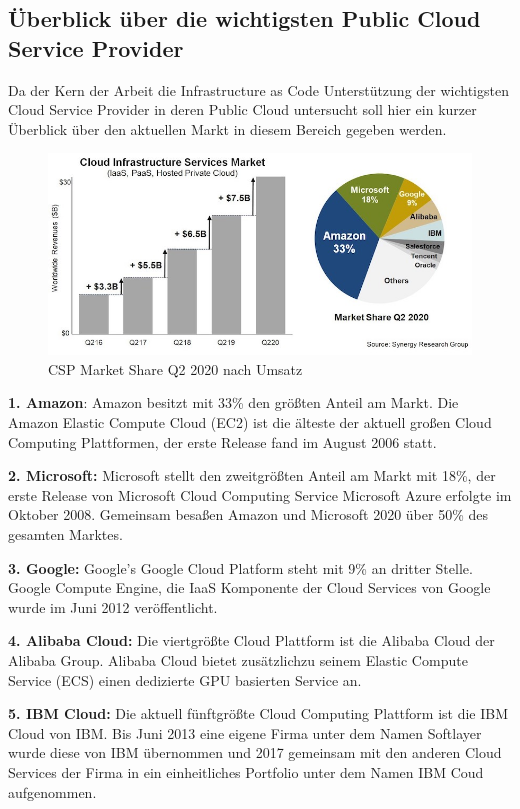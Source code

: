 \begin{spacing}{1.2}
\subsection{Überblick über die wichtigsten Public Cloud Service Provider}
Da der Kern der Arbeit die Infrastructure as Code Unterstützung der
wichtigsten Cloud Service Provider in deren Public Cloud untersucht soll hier
ein kurzer Überblick über den aktuellen Markt in diesem Bereich gegeben werden.

\begin{figure}[H]
  \includegraphics[width=1.0\textwidth]{fig/hauptteil/CIS_Q220.jpg}
  \caption{CSP Market Share Q2 2020 nach Umsatz}
  \centering
\end{figure}

\textbf{1. Amazon}: Amazon besitzt mit 33\% den größten Anteil am Markt.
Die Amazon Elastic Compute Cloud (EC2) ist die älteste der aktuell großen Cloud
Computing Plattformen, der erste Release fand im August 2006 statt.

\textbf{2. Microsoft: } Microsoft stellt den zweitgrößten Anteil am Markt mit
18\%, der erste Release von Microsoft Cloud Computing Service Microsoft Azure
erfolgte im Oktober 2008. Gemeinsam besaßen Amazon und Microsoft 2020 über 50\%
des gesamten Marktes.

\textbf{3. Google: } Google's Google Cloud Platform steht mit 9\% an dritter
Stelle. Google Compute Engine, die IaaS Komponente der Cloud Services von
Google wurde im Juni 2012 veröffentlicht.

\textbf{4. Alibaba Cloud: } Die viertgrößte Cloud Plattform ist die
Alibaba Cloud der Alibaba Group. Alibaba Cloud bietet zusätzlichzu seinem
Elastic Compute Service (ECS) einen dedizierte GPU basierten Service an. 

\textbf{5. IBM Cloud: } Die aktuell fünftgrößte Cloud Computing Plattform ist
die IBM Cloud von IBM. Bis Juni 2013 eine eigene Firma unter dem Namen Softlayer
wurde diese von IBM übernommen und 2017 gemeinsam mit den anderen Cloud Services
der Firma in ein einheitliches Portfolio unter dem Namen IBM Coud aufgenommen.\\


\end{spacing}
